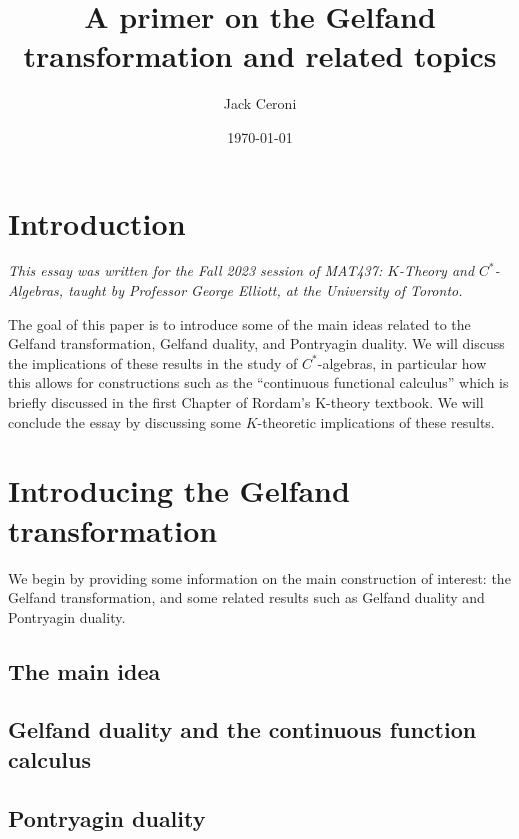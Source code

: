 \documentclass[aps,pra,showpacs,notitlepage,onecolumn,superscriptaddress,nofootinbib]{revtex4-1}
\theoremstyle{definition}
\begin{document}
\title{A primer on the Gelfand transformation and related topics}
\author{Jack Ceroni}

\date{\today}

\maketitle

\section{Introduction}

\noindent \emph{This essay was written for the Fall 2023 session of MAT437: $K$-Theory and $C^{*}$-Algebras, taught by Professor George Elliott, at the University of Toronto.}
\newline

\noindent The goal of this paper is to introduce some of the main ideas related to the Gelfand transformation, Gelfand duality, and
Pontryagin duality. We will discuss the implications of these results in the study of $C^{*}$-algebras, in particular how this allows for constructions
such as the ``continuous functional calculus'' which is briefly discussed in the first Chapter of Rordam's K-theory textbook. We will conclude the essay by
discussing some $K$-theoretic implications of these results.

\section{Introducing the Gelfand transformation}

\noindent We begin by providing some information on the main construction of interest: the Gelfand transformation, and some related results such as Gelfand duality and Pontryagin
duality.

\subsection{The main idea}



\subsection{Gelfand duality and the continuous function calculus}

\subsection{Pontryagin duality}
\end{document}
